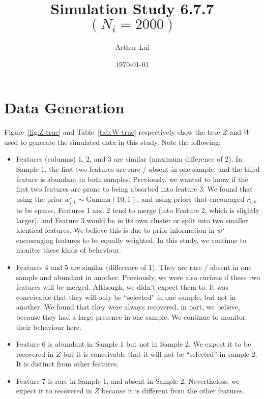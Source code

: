 \documentclass[10pt]{article} %
\title{Simulation Study 6.7.7 $(N_i=2000)$}
\author{Arthur Lui}
\date{\today} %
\newcommand{\Gam}{ \text{Gamma} }
\begin{document}
\maketitle



\section{Data Generation}\label{sec:data-generation}
Figure~\ref{fig:Z-true} and Table~\ref{tab:W-true} respectively show the true
$Z$ and $W$ used to generate the simulated data in this study. Note the following:
\begin{itemize}
  \item Features (columns) 1, 2, and 3 are similar (maximum difference of 2).
    In Sample 1, the first two features are rare / absent in one sample, and
    the third feature is abundant in both samples. Previously, we wanted to
    know if the first two features are prone to being absorbed into feature 3. We
    found that using the prior $w^\star_{i,k} \sim \Gam(10, 1)$, and using priors
    that encouraged $r_{i,k}$ to be sparse, Features 1 and 2 tend to merge
    (into Feature 2, which is slightly larger), and Feature 3 would be in its
    own cluster or split into two smaller identical features. We believe this is 
    due to prior information in $w^\star$ encouraging features to be equally weighted.
    In this study, we continue to monitor these kinds of behaviour.
  \item Features 4 and 5 are similar (difference of 1). They are rare / absent
    in one sample and abundant in another. Previously, we were also curious if
    these two features will be merged. Although, we didn't expect them to. It was
    conceivable that they will only be ``selected'' in one sample, but not in
    another. We found that they were always recovered, in part, we believe, because
    they had a large presence in one sample. We continue to monitor their behaviour
    here.
  \item Feature 6 is abundant in Sample 1 but not in Sample 2. We expect it to be
    recovered in $Z$ but it is conceivable that it will not be ``selected'' in sample
    2. It is distinct from other features.
  \item Feature 7 is rare in Sample 1, and absent in Sample 2. Nevertheless, we
    expect it to recovered in $Z$ because it is different from the other
    features.
\end{itemize}
\end{document}
